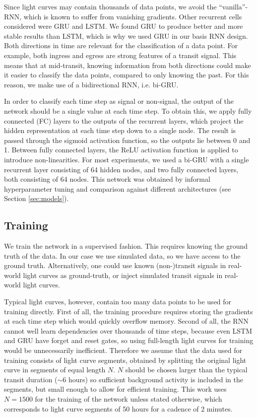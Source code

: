 Since light curves may contain thousands of data points, we avoid the ``vanilla''-RNN, which is known to suffer from vanishing gradients. Other recurrent cells considered were GRU and LSTM. We found GRU to produce better and more stable results than LSTM, which is why we used GRU in our basis RNN design. Both directions in time are relevant for the classification of a data point. For example, both ingress and egress are strong features of a transit signal. This means that at mid-transit, knowing information from both directions could make it easier to classify the data points, compared to only knowing the past. For this reason, we make use of a bidirectional RNN, i.e. bi-GRU.

In order to classify each time step as signal or non-signal, the output of the network should be a single value at each time step. To obtain this, we apply fully connected (FC) layers to the outputs of the recurrent layers, which project the hidden representation at each time step down to a single node. The result is passed through the sigmoid activation function, so the outputs lie between 0 and 1. Between fully connected layers, the ReLU activation function is applied to introduce non-linearities. For most experiments, we used a bi-GRU with a single recurrent layer consisting of 64 hidden nodes, and two fully connected layers, both consisting of 64 nodes. This network was obtained by informal hyperparameter tuning and comparison against different architectures (see Section \ref{sec:models}).

\subsection{Training}
\label{sec:training}

We train the network in a supervised fashion. This requires knowing the ground truth of the data. In our case we use simulated data, so we have access to the ground truth. Alternatively, one could use known (non-)transit signals in real-world light curves as ground-truth, or inject simulated transit signals in real-world light curves. 

Typical light curves, however, contain too many data points to be used for training directly. First of all, the training procedure requires storing the gradients at each time step which would quickly overflow memory. Second of all, the RNN cannot well learn dependencies over thousands of time steps, because even LSTM and GRU have forget and reset gates, so using full-length light curves for training would be unnecessarily inefficient. Therefore we assume that the data used for training consists of light curve segments, obtained by splitting the original light curve in segments of equal length $N$. $N$ should be chosen larger than the typical transit duration ($\sim$6 hours) so sufficient background activity is included in the segments, but small enough to allow for efficient training. This work uses $N=1500$ for the training of the network unless stated otherwise, which corresponds to light curve segments of 50 hours for a cadence of 2 minutes.

